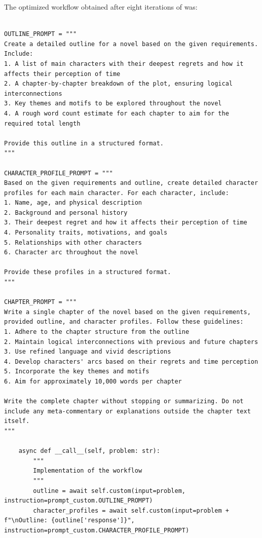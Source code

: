 The optimized workflow obtained after eight iterations of \model was:

\label{appendix:novel generation workflow}

\begin{tcolorbox}[title={\textbf{\small Novel generation workflow}}, boxrule=2pt, arc=0mm, breakable]\begin{verbatim}

OUTLINE_PROMPT = """
Create a detailed outline for a novel based on the given requirements. Include:
1. A list of main characters with their deepest regrets and how it affects their perception of time
2. A chapter-by-chapter breakdown of the plot, ensuring logical interconnections
3. Key themes and motifs to be explored throughout the novel
4. A rough word count estimate for each chapter to aim for the required total length

Provide this outline in a structured format.
"""

CHARACTER_PROFILE_PROMPT = """
Based on the given requirements and outline, create detailed character profiles for each main character. For each character, include:
1. Name, age, and physical description
2. Background and personal history
3. Their deepest regret and how it affects their perception of time
4. Personality traits, motivations, and goals
5. Relationships with other characters
6. Character arc throughout the novel

Provide these profiles in a structured format.
"""

CHAPTER_PROMPT = """
Write a single chapter of the novel based on the given requirements, provided outline, and character profiles. Follow these guidelines:
1. Adhere to the chapter structure from the outline
2. Maintain logical interconnections with previous and future chapters
3. Use refined language and vivid descriptions
4. Develop characters' arcs based on their regrets and time perception
5. Incorporate the key themes and motifs
6. Aim for approximately 10,000 words per chapter

Write the complete chapter without stopping or summarizing. Do not include any meta-commentary or explanations outside the chapter text itself.
"""

    async def __call__(self, problem: str):
        """
        Implementation of the workflow
        """
        outline = await self.custom(input=problem, instruction=prompt_custom.OUTLINE_PROMPT)
        character_profiles = await self.custom(input=problem + f"\nOutline: {outline['response']}", instruction=prompt_custom.CHARACTER_PROFILE_PROMPT)
        

\end{verbatim}
\end{tcolorbox}
